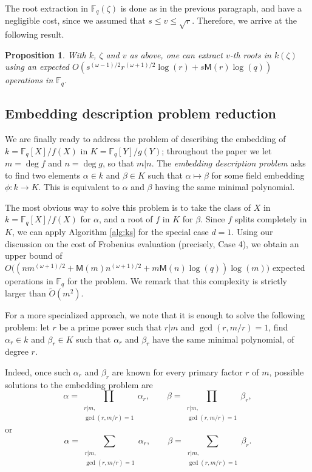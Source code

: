 \documentclass[12pt]{article}
\theoremstyle{plain}
\newtheorem{proposition}[theorem]{Proposition}
\theoremstyle{definition}
\newcommand{\tildO}{\tilde{O}}
\def\F{\ensuremath{\mathbb{F}}}
\def\MM{\ensuremath{\mathsf{M}}}
\begin{document}
The root extraction in $\F_q(\zeta)$ is done as in the previous
paragraph, and have a negligible cost, since we assumed that $s \le v
\le \sqrt{r}$. Therefore, we arrive at the following result.

\begin{proposition}\label{prop:root_high_degree_extension}
With $k$, $\zeta$ and $v$ as above, one can extract $v$-th roots in
$k(\zeta)$ using an expected
$O(s^{(\omega-1)/2}r^{(\omega+1)/2}\log(r) + s\MM(r)\log(q))$
operations in $\F_q$.
\end{proposition}




\subsection{Embedding description problem reduction}

We are finally ready to address the problem of describing the embedding of
$k=\F_q[X]/f(X)$ in $K=\F_q[Y]/g(Y)$; throughout the paper we let $m=\deg f$ and
$n=\deg g$, so that $m|n$. The \emph{embedding description problem}
asks to find two elements $\alpha\in k$ and $\beta\in K$ such that
$\alpha\mapsto\beta$ for some field embedding $\phi:k\to K$. This is
equivalent to $\alpha$ and $\beta$ having the same minimal polynomial.

The most obvious way to solve this problem is to take the class of $X$
in $k=\F_q[X]/f(X)$ for $\alpha$, and a root of $f$ in $K$ for
$\beta$. Since $f$ splits completely in $K$, we can apply Algorithm
\ref{alg:ks} for the special case $d = 1$. Using our discussion on the
cost of Frobenius evaluation (precisely, Case 4), we obtain an upper
bound of $O\bigl((nm^{(\omega+1)/2} + \MM(m)n^{(\omega+1)/2} +
m\MM(n)\log(q))\log(m)\bigr)$ expected operations in $\F_q$ for the
problem. We remark that this complexity is strictly larger than
$\tildO(m^2)$.

For a more specialized approach, we note that it is enough to solve
the following problem: let $r$ be a prime power such that $r|m$ and
$\gcd(r,m/r)=1$, find $\alpha_r\in k$ and $\beta_r\in K$ such that
$\alpha_r$ and $\beta_r$ have the same minimal polynomial, of degree $r$.

Indeed, once such $\alpha_r$ and $\beta_r$ are known for every primary
factor $r$ of $m$, possible solutions to the embedding problem are
\begin{equation*}
  \alpha = \prod_{\substack{r|m,\\\gcd(r,m/r)=1}}\alpha_r,\qquad
  \beta = \prod_{\substack{r|m,\\\gcd(r,m/r)=1}}\beta_r,
\end{equation*}
or
\begin{equation*}
  \alpha = \sum_{\substack{r|m,\\\gcd(r,m/r)=1}}\alpha_r,\qquad
  \beta = \sum_{\substack{r|m,\\\gcd(r,m/r)=1}}\beta_r.
\end{equation*}
\end{document}
